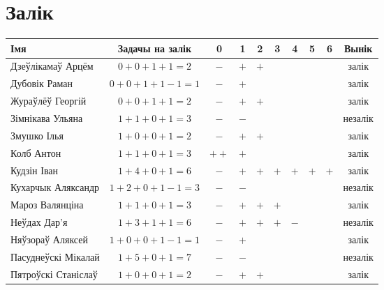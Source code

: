 \documentclass[12pt, a4paper]{extarticle}
\begin{document}
    \section{Залік}
    \begin{table}[H]
        \begin{minipage}{\textwidth}
            \begin{tabular}{|l|c|c|c|c|c|c|c|c|c|}
                \hline
                Імя                 & Задачы на залік &  0\footnotemark  &1&2&3&  4  &  5  &  6  &  Вынік  \\ \hline
                Дзеўлікамаў Арцём   &   $0+0+1+1=2$   & $-$  & $+$ & $+$ &     &     &     &     &  залік  \\ \hline
                Дубовік Раман       &  $0+0+1+1-1=1$  & $-$  & $+$ &     &     &     &     &     &  залік  \\ \hline
                Жураўлёў Георгій    &   $0+0+1+1=2$   & $-$  & $+$ & $+$ &     &     &     &     &  залік  \\ \hline
                Зімнікава Ульяна    &   $1+1+0+1=3$   & $-$  & $-$ &     &     &     &     &     & незалік \\ \hline
                Змушко Ілья         &   $1+0+0+1=2$   & $-$  & $+$ & $+$ &     &     &     &     &  залік  \\ \hline
                Колб Антон          &   $1+1+0+1=3$   & $++$ & $+$ &     &     &     &     &     &  залік  \\ \hline
                Кудзін Іван         &   $1+4+0+1=6$   & $-$  & $+$ & $+$ & $+$ & $+$ & $+$ & $+$ &  залік  \\ \hline
                Кухарчык Аляксандр  &  $1+2+0+1-1=3$  & $-$  & $-$ &     &     &     &     &     & незалік \\ \hline
                Мароз Валянціна     &   $1+1+0+1=3$   & $-$  & $+$ & $+$ & $+$ &     &     &     &  залік  \\ \hline
                Неўдах Дар'я        &   $1+3+1+1=6$   & $-$  & $+$ & $+$ & $+$ & $-$ &     &     & незалік \\ \hline
                Няўзораў Аляксей    &  $1+0+0+1-1=1$  & $-$  & $+$ &     &     &     &     &     &  залік  \\ \hline
                Пасуднеўскі Мікалай &   $1+5+0+1=7$   & $-$  & $-$ &     &     &     &     &     & незалік \\ \hline
                Пятроўскі Станіслаў &   $1+0+0+1=2$   & $-$  & $+$ & $+$ &     &     &     &     &  залік  \\ \hline

\end{tabular}
\end{minipage}
\end{table}
\end{document}
